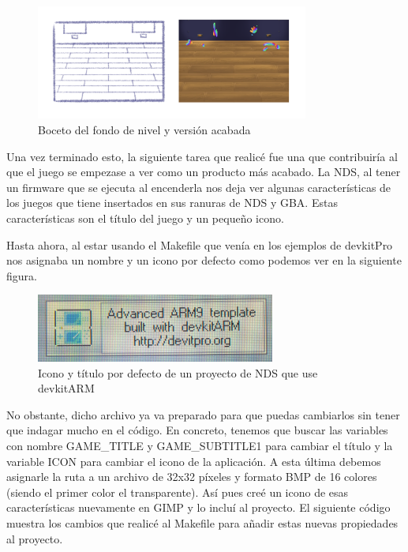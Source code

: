 \clearpage

\begin{figure}[htbp]
\centering
  \includegraphics[width=0.8\textwidth]{archivos/level_bg.png}
  \caption{Boceto del fondo de nivel y versión acabada}
  \label{fig:level:bg}
\end{figure}

 \vspace{0.5cm}

Una vez terminado esto, la siguiente tarea que realicé fue una que  contribuiría al que el juego se empezase a ver como un producto más acabado. La NDS, al tener un firmware que se ejecuta al encenderla nos deja ver algunas características de los juegos que tiene insertados en sus ranuras de NDS y GBA. Estas características son el título del juego y un pequeño icono.

 \vspace{0.5cm}

Hasta ahora, al estar usando el Makefile que venía en los ejemplos de devkitPro nos asignaba un nombre y un icono por defecto como podemos ver en la siguiente figura.

 \vspace{0.5cm}

\begin{figure}[htbp]
\centering
  \includegraphics[width=0.7\textwidth]{archivos/icon_default.jpg}
  \caption{Icono y título por defecto de un proyecto de NDS que use devkitARM}
  \label{fig:icon_default}
\end{figure}

 \vspace{0.5cm}

No obstante, dicho archivo ya va preparado para que puedas cambiarlos sin tener que indagar mucho en el código. En concreto, tenemos que buscar las variables con nombre GAME\_TITLE y GAME\_SUBTITLE1 para cambiar el título y la variable ICON para cambiar el icono de la aplicación. A esta última debemos asignarle la ruta a un archivo de 32x32 píxeles y formato BMP de 16 colores (siendo el primer color el transparente). Así pues creé un icono de esas características nuevamente en GIMP y lo incluí al proyecto. El siguiente código muestra los cambios que realicé al Makefile para añadir estas nuevas propiedades al proyecto.


